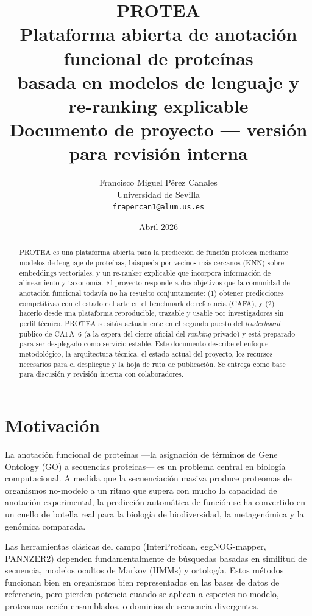 \documentclass[11pt,a4paper]{article}
\title{\textbf{PROTEA}\\[0.3em]
  \large Plataforma abierta de anotación funcional de proteínas\\
  basada en modelos de lenguaje y re-ranking explicable\\[0.8em]
  \normalsize Documento de proyecto — versión para revisión interna}
\author{Francisco Miguel Pérez Canales\\
  \small Universidad de Sevilla\\
  \small \texttt{frapercan1@alum.us.es}}
\date{Abril 2026}
\begin{document}
\maketitle

\begin{abstract}
\noindent
PROTEA es una plataforma abierta para la predicción de función proteica mediante
modelos de lenguaje de proteínas, búsqueda por vecinos más cercanos (KNN) sobre
embeddings vectoriales, y un re-ranker explicable que incorpora información de
alineamiento y taxonomía. El proyecto responde a dos objetivos que la comunidad
de anotación funcional todavía no ha resuelto conjuntamente: (1) obtener
predicciones competitivas con el estado del arte en el benchmark de referencia
(CAFA), y (2) hacerlo desde una plataforma reproducible, trazable y usable por
investigadores sin perfil técnico. PROTEA se sitúa actualmente en el segundo
puesto del \emph{leaderboard} público de CAFA~6 (a la espera del cierre oficial
del \emph{ranking} privado) y está preparado para ser desplegado como servicio
estable. Este documento describe el enfoque metodológico, la arquitectura
técnica, el estado actual del proyecto, los recursos necesarios para el
despliegue y la hoja de ruta de publicación. Se entrega como base para
discusión y revisión interna con colaboradores.
\end{abstract}

\tableofcontents

\vspace{1em}

\section{Motivación}

La anotación funcional de proteínas —la asignación de términos de Gene Ontology
(GO) a secuencias proteicas— es un problema central en biología computacional.
A medida que la secuenciación masiva produce proteomas de organismos no-modelo
a un ritmo que supera con mucho la capacidad de anotación experimental, la
predicción automática de función se ha convertido en un cuello de botella real
para la biología de biodiversidad, la metagenómica y la genómica comparada.

Las herramientas clásicas del campo (InterProScan, eggNOG-mapper, PANNZER2)
dependen fundamentalmente de búsquedas basadas en similitud de secuencia,
modelos ocultos de Markov (HMMs) y ortología. Estos métodos funcionan bien en
organismos bien representados en las bases de datos de referencia, pero pierden
potencia cuando se aplican a especies no-modelo, proteomas recién ensamblados,
o dominios de secuencia divergentes.
\end{document}
